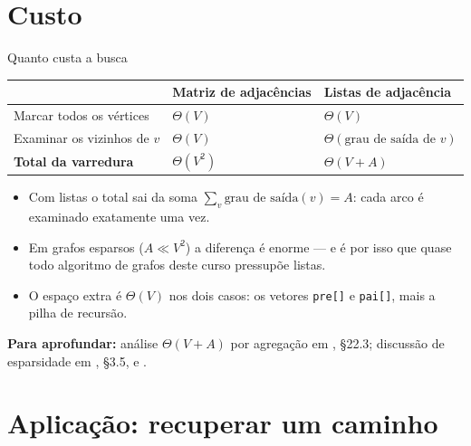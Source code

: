 \documentclass[aspectratio=169]{beamer}
\newcommand{\fonte}[1]{%
  \vfill
  {\tiny\color{gray!55!black}\textbf{Para aprofundar:} #1\par}%
}
\begin{document}
\section{Custo}

\begin{frame}{Quanto custa a busca}
  \begin{center}
  {\small
  \begin{tabular}{lll}
    \toprule
    & \textbf{Matriz de adjacências} & \textbf{Listas de adjacência} \\
    \midrule
    Marcar todos os vértices        & $\Theta(V)$   & $\Theta(V)$ \\
    Examinar os vizinhos de $v$     & $\Theta(V)$   & $\Theta(\text{grau de saída de } v)$ \\
    \textbf{Total da varredura}     & $\Theta(V^2)$ & $\Theta(V + A)$ \\
    \bottomrule
  \end{tabular}}
  \end{center}
  \medskip
  {\small
  \begin{itemize}\small
    \item Com listas o total sai da soma $\sum_v \text{grau de saída}(v) = A$:
          cada arco é examinado exatamente uma vez.
    \item Em grafos esparsos ($A \ll V^2$) a diferença é enorme --- e é por isso
          que quase todo algoritmo de grafos deste curso pressupõe listas.
    \item O espaço extra é $\Theta(V)$ nos dois casos: os vetores
          \texttt{pre[]} e \texttt{pai[]}, mais a pilha de recursão.
  \end{itemize}}
  \fonte{análise $\Theta(V+A)$ por agregação em \cite{cormen2009introduction},
  §22.3; discussão de esparsidade em \cite{levitin2012introduction}, §3.5, e
  \cite{feofiloff2020algoritmos}.}
\end{frame}

\section{Aplicação: recuperar um caminho}
\end{document}
